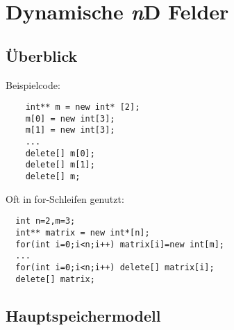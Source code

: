 \documentclass[16pt]{beamer}
\begin{document}
\section{Dynamische \protect\textit{n}D Felder}
\subsection{Überblick}
\begin{frame}[fragile]
  Beispielcode:
  \begin{lstlisting}
    int** m = new int* [2];
    m[0] = new int[3];
    m[1] = new int[3];
    ...
    delete[] m[0];
    delete[] m[1];
    delete[] m;
  \end{lstlisting}
  Oft in for-Schleifen genutzt:
  \begin{lstlisting}
  int n=2,m=3;
  int** matrix = new int*[n];
  for(int i=0;i<n;i++) matrix[i]=new int[m];
  ...
  for(int i=0;i<n;i++) delete[] matrix[i];
  delete[] matrix;
  \end{lstlisting}
\end{frame}

\subsection{Hauptspeichermodell}
\begin{frame}
\end{frame}
\end{document}
